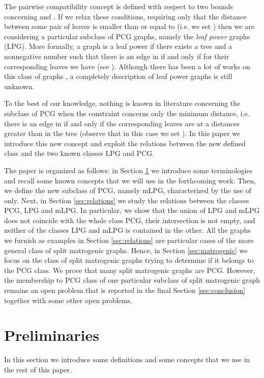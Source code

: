 \documentclass[dvipdfm]{llncs}
\begin{document}
The pairwise compatibility concept is defined with respect to two bounds concerning  and . If we relax these conditions, requiring only that the distance between some pair of leaves is smaller than or equal to  (i.e. we set ) then we are considering a particular subclass of PCG graphs, namely the \textsl{leaf power} graphs (LPG). More formally, a graph  is a leaf power if there exists a tree  and a nonnegative number  such that there is an edge  in  if and only if for their corresponding leaves  we have  (see \cite{NRTh02}). Although there has been a lot of works on this class of graphs \cite{B}, a completely description of leaf power graphs is still unknown. 


To the best of our knowledge, nothing is known in literature concerning the subclass of PCG when the constraint concerns only the minimum distance, i.e. there is an edge in  if and only if the corresponding leaves are at a distances greater than  in the tree (observe that in this case we set ). In this paper we introduce this new concept and exploit the relations between the new defined class and the two known classes LPG and PCG.

The paper is organized as follows: in Section \ref{sec:preliminaries} we introduce some terminologies and recall some known concepts that we will use in the forthcoming work. Then, we define the new subclass of PCG, namely mLPG, characterized by the use of  only. Next, in Section \ref{sec:relations} we study the relations between the classes PCG, LPG and mLPG. In particular, we show that the union of LPG and mLPG does not coincide with the whole class PCG, their intersection is not empty, and neither of the classes LPG and mLPG is contained in the other. All the graphs we furnish as examples in Section \ref{sec:relations} are particular cases of the more general class of split matrogenic graphs. Hence, in Section \ref{sec:matrogenic} we focus on the class of split matrogenic graphs trying to determine if it belongs to the PCG class. We prove that many split matrogenic graphs are PCG. However, the membership to PCG class of one particular subclass of split matrogenic graph remains an open problem that is reported in the final Section \ref{sec:conclusion} together with some other open problems.
\section{Preliminaries}\label{sec:preliminaries}

In this section we introduce some definitions and some concepts that we use in the rest of  this paper. 
\end{document}
